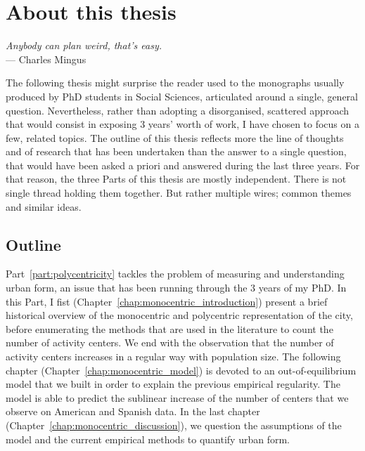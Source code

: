 

\chapter{About this thesis}
\label{chap:methodology}


\begin{flushright}{\slshape    
Anybody can plan weird, that's easy.} \\ \medskip
--- Charles Mingus
\end{flushright}


\bigskip 


The following thesis might surprise the reader used to the monographs usually
produced by PhD students in Social Sciences, articulated around a single,
general question. Nevertheless, rather than adopting a disorganised, scattered
approach that would consist in exposing $3$ years' worth of work, I have chosen
to focus on a few, related topics. The outline of this thesis reflects more the
line of thoughts and of research that has been undertaken than the answer to a
single question, that would have been asked a priori and answered during the
last three years. For that reason, the three Parts of this thesis are mostly
independent. There is not single thread holding them together. But rather multiple
wires; common themes and similar ideas. 

\section{Outline}

Part~\ref{part:polycentricity} tackles the problem of measuring and
understanding urban form, an issue that has been running through the $3$ years
of my PhD. In this Part, I fist (Chapter~\ref{chap:monocentric_introduction})
present a brief historical overview of the monocentric and polycentric
representation of the city, before enumerating the methods that are used in the
literature to count the number of activity centers. We end with the observation
that the number of activity centers increases in a regular way with population
size. The following chapter (Chapter~\ref{chap:monocentric_model}) is devoted to
an out-of-equilibrium model that we built in order to explain the previous
empirical regularity. The model is able to predict the sublinear increase of the
number of centers that we observe on American and Spanish data. In the last
chapter (Chapter~\ref{chap:monocentric_discussion}), we question the assumptions
of the model and the current empirical methods to quantify urban form.\\

